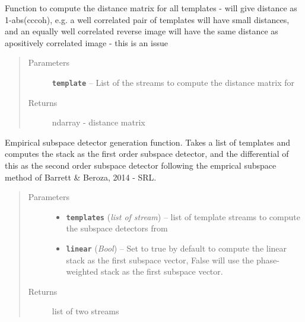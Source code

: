 \documentclass[a4paper,10pt,english]{sphinxmanual}
\begin{document}

\begin{fulllineitems}
\label{utils:clustering.distance_matrix}
Function to compute the distance matrix for all templates - will give
distance as 1-abs(cccoh), e.g. a well correlated pair of templates will
have small distances, and an equally well correlated reverse image will
have the same distance as apositively correlated image - this is an issue
\begin{quote}\begin{description}
\item[{Parameters}] \leavevmode
\textbf{\texttt{template}} -- List of the streams to compute the distance matrix for

\item[{Returns}] \leavevmode
ndarray - distance matrix

\end{description}\end{quote}

\end{fulllineitems}


\begin{fulllineitems}
\label{utils:clustering.empirical_SVD}
Empirical subspace detector generation function.  Takes a list of templates
and computes the stack as the first order subspace detector, and the
differential of this as the second order subspace detector following
the emprical subspace method of Barrett \& Beroza, 2014 - SRL.
\begin{quote}\begin{description}
\item[{Parameters}] \leavevmode\begin{itemize}
\item {} 
\textbf{\texttt{templates}} (\emph{list of stream}) -- list of template streams to compute the subspace detectors        from

\item {} 
\textbf{\texttt{linear}} (\emph{Bool}) -- Set to true by default to compute the linear stack as the        first subspace vector, False will use the phase-weighted stack as the        first subspace vector.

\end{itemize}

\item[{Returns}] \leavevmode
list of two streams

\end{description}\end{quote}

\end{fulllineitems}
\end{document}
